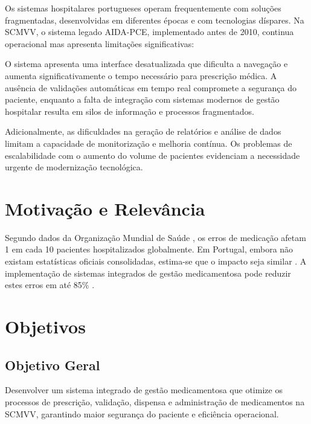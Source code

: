 Os sistemas hospitalares portugueses operam frequentemente com soluções fragmentadas, desenvolvidas em diferentes épocas \cite{kazemi2016} e com tecnologias díspares. Na SCMVV, o sistema legado AIDA-PCE, implementado antes de 2010, continua operacional mas apresenta limitações significativas:

O sistema apresenta uma interface desatualizada que dificulta a navegação e aumenta significativamente o tempo necessário para prescrição médica. A ausência de validações automáticas em tempo real \cite{moss2015} compromete a segurança do paciente, enquanto a falta de integração com sistemas modernos de gestão hospitalar resulta em silos de informação e processos fragmentados. 

Adicionalmente, as dificuldades na geração de relatórios e análise de dados \cite{bowles2020} limitam a capacidade de monitorização e melhoria contínua. Os problemas de escalabilidade com o aumento do volume de pacientes evidenciam a necessidade urgente de modernização tecnológica.


\section{Motivação e Relevância}

Segundo dados da Organização Mundial de Saúde \cite{who2017,who2022}, os erros de medicação afetam 1 em cada 10 pacientes \cite{who2017} hospitalizados globalmente. Em Portugal, embora não existam estatísticas oficiais consolidadas, estima-se que o impacto seja similar \cite{dgs2020}. A implementação de sistemas integrados de gestão medicamentosa \cite{shermock2023,vaghasiya2023} pode reduzir estes erros em até 85\% \cite{mahoney2007}.


\section{Objetivos}

\subsection{Objetivo Geral}
Desenvolver um sistema integrado de gestão medicamentosa que otimize os processos de prescrição, validação, dispensa e administração de medicamentos na SCMVV, garantindo maior segurança do paciente \cite{ciapponi2021} e eficiência operacional.

